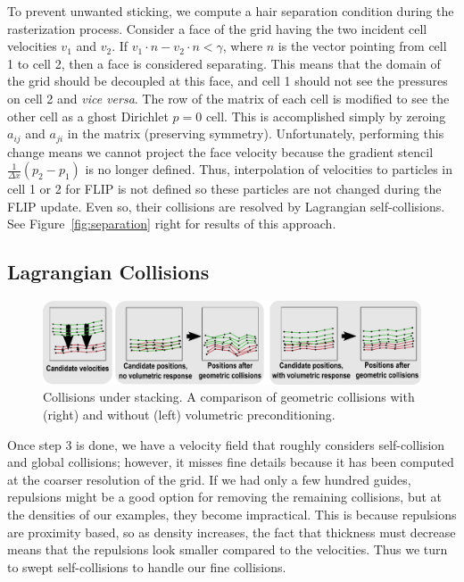 To prevent unwanted sticking, we compute a hair separation condition during the
rasterization process. Consider a face of the grid having the two incident cell
velocities $v_1$ and $v_2$.  If $v_1\cdot n - v_2\cdot n<\gamma$,
where $n$ is the vector pointing from cell 1 to cell 2, then a face is
considered separating. This means that the domain of the grid should be
decoupled at this face, and cell 1 should not see the pressures on cell 2 and
\emph{vice versa}.  The row of the matrix of each cell is modified to see the
other cell as a ghost Dirichlet $p=0$ cell. This is accomplished simply by
zeroing $a_{ij}$ and $a_{ji}$ in the matrix (preserving
symmetry). Unfortunately, performing this change means we cannot project the
face velocity because the gradient stencil $\frac{1}{\Delta x}(p_2-p_1)$ is no
longer defined. Thus, interpolation of velocities to particles in cell 1 or 2
for FLIP is not defined so these particles are not changed during the FLIP update.  Even so,
their collisions are resolved by Lagrangian self-collisions. See
Figure~\ref{fig:separation} right for results of this approach.

\subsection{Lagrangian Collisions}
\label{sec:collisions}

\begin{figure}[b!]
  \centering
  \includegraphics[width=.99\linewidth]{hair/figures/stacking}
  \caption[Collisions under stacking.]{\label{fig:stacking} Collisions under stacking. A
    comparison of geometric collisions with (right) and without (left)
    volumetric preconditioning.}
\end{figure}


Once step 3 is done, we have a velocity field that roughly considers
self-collision and global collisions; however, it misses fine details because it
has been computed at the coarser resolution of the grid. If we had only a few
hundred guides, repulsions might be a good option for removing the remaining
collisions, but at the densities of our examples, they become impractical.  This
is because repulsions are proximity based, so as density increases, the fact that
thickness must decrease means that the repulsions look smaller compared to the
velocities. Thus we turn to swept self-collisions to handle our fine collisions.

